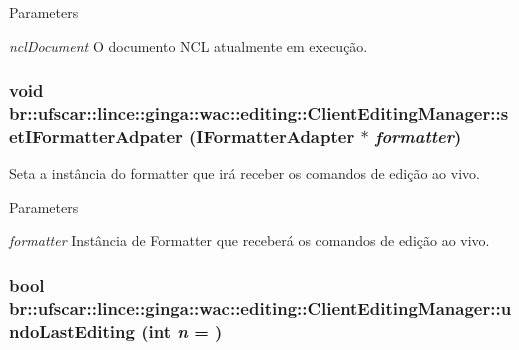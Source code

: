 \begin{DoxyParams}{Parameters}
\item[{\em nclDocument}]O documento NCL atualmente em execução. \end{DoxyParams}
\hypertarget{classbr_1_1ufscar_1_1lince_1_1ginga_1_1wac_1_1editing_1_1ClientEditingManager_a07b41ca3cb59e493972d73c8f8e724b8}{
\subsubsection[{setIFormatterAdpater}]{\setlength{\rightskip}{0pt plus 5cm}void br::ufscar::lince::ginga::wac::editing::ClientEditingManager::setIFormatterAdpater ({\bf IFormatterAdapter} $\ast$ {\em formatter})}}
\label{classbr_1_1ufscar_1_1lince_1_1ginga_1_1wac_1_1editing_1_1ClientEditingManager_a07b41ca3cb59e493972d73c8f8e724b8}


Seta a instância do formatter que irá receber os comandos de edição ao vivo. 


\begin{DoxyParams}{Parameters}
\item[{\em formatter}]Instância de Formatter que receberá os comandos de edição ao vivo. \end{DoxyParams}
\hypertarget{classbr_1_1ufscar_1_1lince_1_1ginga_1_1wac_1_1editing_1_1ClientEditingManager_a7094577521bafedebcd7edafe753774f}{
\subsubsection[{undoLastEditing}]{\setlength{\rightskip}{0pt plus 5cm}bool br::ufscar::lince::ginga::wac::editing::ClientEditingManager::undoLastEditing (int {\em n} = {})}}
\label{classbr_1_1ufscar_1_1lince_1_1ginga_1_1wac_1_1editing_1_1ClientEditingManager_a7094577521bafedebcd7edafe753774f}


